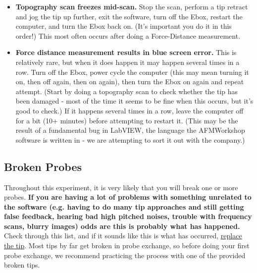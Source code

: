 \documentclass{../lab}
\begin{document}
\begin{itemize}
    \item \textbf{Topography scan freezes mid-scan.} Stop the scan, perform a tip retract and jog the tip up further, exit the software, turn off the Ebox, restart the computer, and turn the Ebox back on. (It's important you do it in this order!) This most often occurs after doing a Force-Distance measurement.

    \item \textbf{Force distance measurement results in blue screen error.} This is relatively rare, but when it does happen it may happen several times in a row. Turn off the Ebox, power cycle the computer (this may mean turning it on, then off again, then on again), then turn the Ebox on again and repeat attempt. (Start by doing a topography scan to check whether the tip has been damaged - most of the time it seems to be fine when this occurs, but it's good to check.) If it happens several times in a row, leave the computer off for a bit (10+ minutes) before attempting to restart it. (This may be the result of a fundamental bug in LabVIEW, the language the AFMWorkshop software is written in - we are attempting to sort it out with the company.)

\end{itemize}


\subsection{Broken Probes}
\label{subsec:BrokenTip}

Throughout this experiment, it is very likely that you will break one or more probes. \textbf{If you are having a lot of problems with something unrelated to the software (e.g. having to do many tip approaches and still getting false feedback, hearing bad high pitched noises, trouble with frequency scans, blurry images) odds are this is probably what has happened.} Check through this list, and if it sounds like this is what has occurred, \hyperref[subsec:exchange_probes]{replace the tip}. Most tips by far get broken in probe exchange, so before doing your first probe exchange, we recommend practicing the process with one of the provided broken tips.
\end{document}
